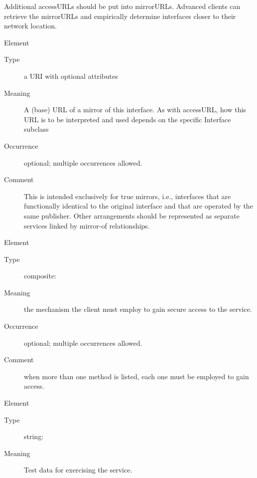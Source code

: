 \documentclass[11pt,a4paper]{ivoa}
\begin{document}
\begin{generated}
\begin{bigdescription}
\begin{description}
                 Additional accessURLs should be put into mirrorURLs.
                 Advanced clients can retrieve the mirrorURLs and 
                 empirically determine interfaces closer to their 
                 network location.
               

\end{description}
\item[Element \xmlel{mirrorURL}]
\begin{description}
\item[Type] a URI with optional attributes
\item[Meaning] 
                 A (base) URL of a mirror of this interface.  As with
                 accessURL, how this URL is to be interpreted and used 
                 depends on the specific Interface subclass
               
\item[Occurrence] optional; multiple occurrences allowed.
\item[Comment] 
                This is intended exclusively for true mirrors, i.e.,
                interfaces that are functionally identical to the
                original interface and that are operated by the same 
                publisher.  Other arrangements should be represented as
                separate services linked by mirror-of relationships.
               

\end{description}
\item[Element \xmlel{securityMethod}]
\begin{description}
\item[Type] composite: 
\item[Meaning] 
                  the mechanism the client must employ to gain secure
                  access to the service.  
               
\item[Occurrence] optional; multiple occurrences allowed.
\item[Comment] 
                  when more than one method is listed, each one must
                  be employed to gain access.  
               

\end{description}
\item[Element \xmlel{testQueryString}]
\begin{description}
\item[Type] string: 
\item[Meaning] 
                  Test data for exercising the service.
               

\end{description}
\end{bigdescription}
\end{generated}
\end{document}
